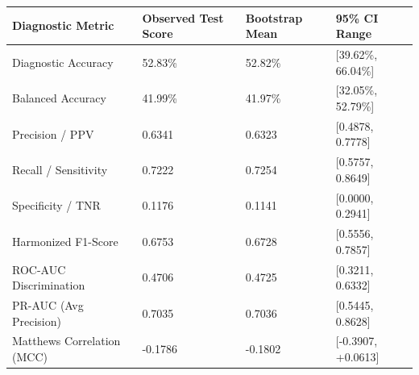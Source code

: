 \begin{tabular}{llll}
\toprule
Diagnostic Metric & Observed Test Score & Bootstrap Mean & 95\% CI Range \\
\midrule
Diagnostic Accuracy & 52.83\% & 52.82\% & [39.62\%, 66.04\%] \\
Balanced Accuracy & 41.99\% & 41.97\% & [32.05\%, 52.79\%] \\
Precision / PPV & 0.6341 & 0.6323 & [0.4878, 0.7778] \\
Recall / Sensitivity & 0.7222 & 0.7254 & [0.5757, 0.8649] \\
Specificity / TNR & 0.1176 & 0.1141 & [0.0000, 0.2941] \\
Harmonized F1-Score & 0.6753 & 0.6728 & [0.5556, 0.7857] \\
ROC-AUC Discrimination & 0.4706 & 0.4725 & [0.3211, 0.6332] \\
PR-AUC (Avg Precision) & 0.7035 & 0.7036 & [0.5445, 0.8628] \\
Matthews Correlation (MCC) & -0.1786 & -0.1802 & [-0.3907, +0.0613] \\
\bottomrule
\end{tabular}
